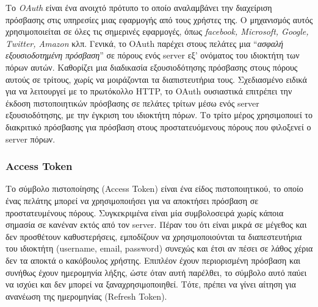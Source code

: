Το \textit{OAuth} είναι ένα ανοιχτό πρότυπο το οποίο αναλαμβάνει την διαχείριση πρόσβασης στις υπηρεσίες μιας εφαρμογής από τους χρήστες της. Ο μηχανισμός αυτός χρησιμοποιείται σε όλες τις σημερινές εφαρμογές, όπως \textit{facebook, Microsoft, Google, Twitter, Amazon} κλπ. Γενικά, το OAuth παρέχει στους πελάτες μια ``\textit{ασφαλή εξουσιοδοτημένη πρόσβαση}'' σε πόρους ενός server εξ' ονόματος του ιδιοκτήτη των πόρων αυτών. Καθορίζει μια διαδικασία εξουσιοδότησης πρόσβασης στους πόρους αυτούς σε τρίτους, χωρίς να μοιράζονται τα διαπιστευτήρια τους. Σχεδιασμένο ειδικά για να λειτουργεί με το πρωτόκολλο HTTP, το OAuth ουσιαστικά επιτρέπει την έκδοση πιστοποιητικών πρόσβασης σε πελάτες τρίτων μέσω ενός server εξουσιοδότησης, με την έγκριση του ιδιοκτήτη πόρων. Το τρίτο μέρος χρησιμοποιεί το διακριτικό πρόσβασης για πρόσβαση στους προστατευόμενους πόρους που φιλοξενεί ο server πόρων.

\subsubsection{Access Token}

Το σύμβολο πιστοποίησης (Access Token) είναι ένα είδος πιστοποιητικού, το οποίο ένας πελάτης μπορεί να χρησιμοποιήσει για να αποκτήσει πρόσβαση σε προστατευμένους πόρους. Συγκεκριμένα είναι μία συμβολοσειρά χωρίς κάποια σημασία σε κανέναν εκτός από τον server. Πέραν του ότι είναι μικρά σε μέγεθος και δεν προσθέτουν καθυστερήσεις, εμποδίζουν να χρησιμοποιούνται τα διαπεστευτήρια του ιδιοκτήτη (username, email, password) συνεχώς και έτσι αν πέσει σε λάθος χέρια δεν τα αποκτά ο κακόβουλος χρήστης. Επιπλέον έχουν περιορισμένη πρόσβαση και συνήθως έχουν ημερομηνία λήξης, ώστε όταν αυτή παρέλθει, το σύμβολο αυτό παύει να ισχύει και δεν μπορεί να ξαναχρησιμοποιηθεί. Τότε, πρέπει να γίνει αίτηση για ανανέωση της ημερομηνίας (Refresh Token).

